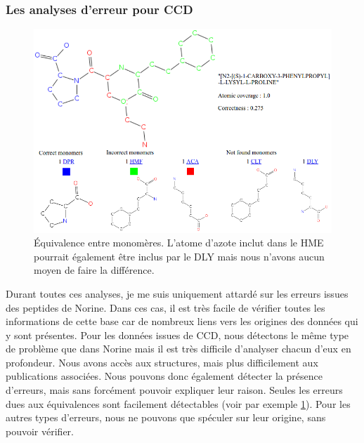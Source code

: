 \subsubsection{Les analyses d'erreur pour CCD}

\begin{figure}[h!]
  \begin{center}
    \includegraphics[width=450px]{Figures/s2m/results/CCD_results.png}
    \caption{\label{CCD_results}Équivalence entre monomères.
    L'atome d'azote inclut dans le HME pourrait également être inclus par le DLY mais nous n'avons aucun moyen de faire la différence.}
  \end{center}
\end{figure}

Durant toutes ces analyses, je me suis uniquement attardé sur les erreurs issues des peptides de Norine.
Dans ces cas, il est très facile de vérifier toutes les informations de cette base car de nombreux liens vers les origines des données qui y sont présentes.
Pour les données issues de CCD, nous détectons le même type de problème que dans Norine mais il est très difficile d'analyser chacun d'eux en profondeur.
Nous avons accès aux structures, mais plus difficilement aux publications associées.
Nous pouvons donc également détecter la présence d'erreurs, mais sans forcément pouvoir expliquer leur raison.
Seules les erreurs dues aux équivalences sont facilement détectables (voir par exemple \ref{CCD_results}).
Pour les autres types d'erreurs, nous ne pouvons que spéculer sur leur origine, sans pouvoir vérifier.